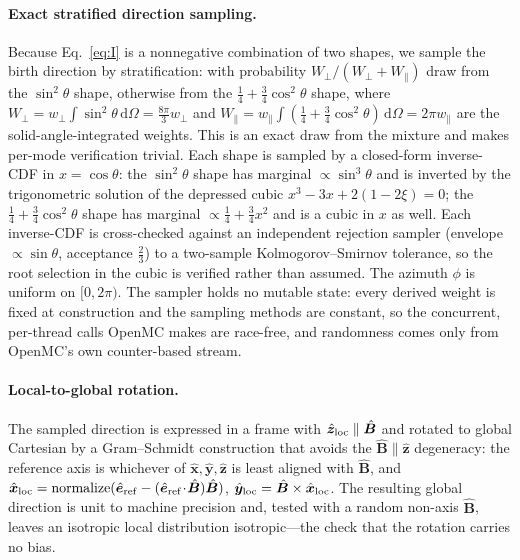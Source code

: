 \documentclass[11pt]{article}
\newcommand{\Bhat}{\hat{\bm{B}}}
\newcommand{\dd}{\,\mathrm{d}}
\begin{document}
\paragraph{Exact stratified direction sampling.}
Because Eq.~\eqref{eq:I} is a nonnegative combination of two shapes, we sample the birth
direction by stratification: with probability $W_\perp/(W_\perp+W_\parallel)$ draw from
the $\sin^2\theta$ shape, otherwise from the $\tfrac14+\tfrac34\cos^2\theta$ shape, where
$W_\perp=w_\perp\!\int\!\sin^2\theta\dd\Omega=\tfrac{8\pi}{3}w_\perp$ and
$W_\parallel=w_\parallel\!\int(\tfrac14+\tfrac34\cos^2\theta)\dd\Omega=2\pi w_\parallel$
are the solid-angle-integrated weights. This is an exact draw from the mixture and makes
per-mode verification trivial. Each shape is sampled by a closed-form inverse-CDF in
$x=\cos\theta$: the $\sin^2\theta$ shape has marginal $\propto\sin^3\theta$ and is inverted
by the trigonometric solution of the depressed cubic $x^3-3x+2(1-2\xi)=0$; the
$\tfrac14+\tfrac34\cos^2\theta$ shape has marginal $\propto\tfrac14+\tfrac34x^2$ and is a
cubic in $x$ as well. Each inverse-CDF is cross-checked against an independent rejection
sampler (envelope $\propto\sin\theta$, acceptance $\tfrac23$) to a two-sample
Kolmogorov--Smirnov tolerance, so the root selection in the cubic is verified rather than
assumed. The azimuth $\phi$ is uniform on $[0,2\pi)$. The sampler holds no mutable state:
every derived weight is fixed at construction and the sampling methods are constant, so the
concurrent, per-thread calls OpenMC makes are race-free, and randomness comes only from
OpenMC's own counter-based stream.

\paragraph{Local-to-global rotation.}
The sampled direction is expressed in a frame with $\hat{\bm z}_{\rm loc}\parallel\Bhat$
and rotated to global Cartesian by a Gram--Schmidt construction that avoids the
$\Bhat\parallel\hat{\bm z}$ degeneracy: the reference axis is whichever of
$\hat{\bm x},\hat{\bm y},\hat{\bm z}$ is least aligned with $\Bhat$, and
$\hat{\bm x}_{\rm loc}=\mathrm{normalize}(\hat{\bm e}_{\rm ref}-(\hat{\bm e}_{\rm ref}\!\cdot\!\Bhat)\Bhat)$,
$\hat{\bm y}_{\rm loc}=\Bhat\times\hat{\bm x}_{\rm loc}$. The resulting global direction is
unit to machine precision and, tested with a random non-axis $\Bhat$, leaves an isotropic
local distribution isotropic---the check that the rotation carries no bias.
\end{document}
